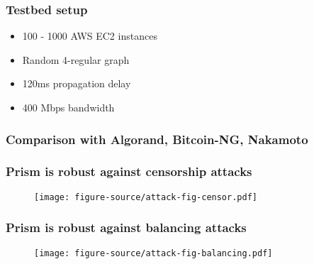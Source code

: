 \documentclass[aspectratio=169]{beamer}
\begin{document}
\begin{frame}
    \frametitle{Testbed setup}
    \begin{itemize}
        \item 100 - 1000 AWS EC2 instances
        \item Random 4-regular graph
        \item 120ms propagation delay
        \item 400 Mbps bandwidth
    \end{itemize}
\end{frame}

\begin{frame}
    \frametitle{Comparison with Algorand, Bitcoin-NG, Nakamoto}
\end{frame}

\begin{frame}
    \frametitle{Prism is robust against censorship attacks}
    \begin{figure}
        \centering
        \texttt{[image: figure-source/attack-fig-censor.pdf]}
    \end{figure}
\end{frame}

\begin{frame}
    \frametitle{Prism is robust against balancing attacks}
    \begin{figure}
        \centering
        \texttt{[image: figure-source/attack-fig-balancing.pdf]}
    \end{figure}
\end{frame}
\end{document}
